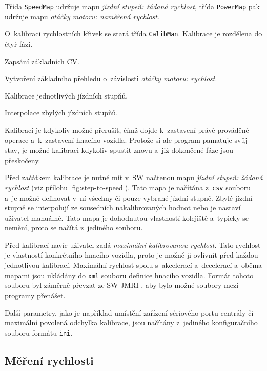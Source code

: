 Třída \texttt{SpeedMap} udržuje mapu \textit{jízdní stupeň: žádaná rychlost},
třída \texttt{Po\-wer\-Map} pak udržuje mapu \textit{otáčky motoru: naměřená
rychlost}.

O~kalibraci rychlostních křivek se stará třída \texttt{CalibMan}. Kalibrace
je rozdělena do čtyř fází.

\begin{compactenum}
\item Zapsání základních \gls{CV}.
\item Vytvoření základního přehledu o~závislosti \textit{otáčky motoru: rychlost}.
\item Kalibrace jednotlivých jízdních stupňů.
\item Interpolace zbylých jízdních stupňů.
\end{compactenum}

Kalibraci je kdykoliv možné přerušit, čímž dojde k~zastavení právě prováděné
operace a~k~zastavení hnacího vozidla. Protože si ale program pamatuje svůj
stav, je možné kalibraci kdykoliv spustit znovu a~již dokončené fáze jsou
přeskočeny.

Před začátkem kalibrace je nutné mít v~SW načtenou mapu \textit{jízdní
stupeň: žádaná rychlost} (viz přílohu \ref{fig:step-to-speed}). Tato mapa je
načítána z~\texttt{csv} souboru a~je možné definovat v~ní všechny či pouze
vybrané jízdní stupně. Zbylé jízdní stupně se interpolují ze sousedních
nakalibrovaných hodnot nebo je nastaví uživatel manuálně. Tato mapa je
dohodnutou vlastností kolejiště a~typicky se nemění, proto se načítá z~jediného
souboru.

Před kalibrací navíc uživatel zadá \textit{maximální kalibrovanou rychlost}.
Tato rychlost je vlastností konkrétního hnacího vozidla, proto je možné ji
ovlivnit před každou jednotlivou kalibrací. Maximální rychlost spolu
s~akcelerací a~decelerací a~oběma mapami jsou ukládány do \texttt{xml} souboru
definice hnacího vozidla. Formát tohoto souboru byl záměrně převzat ze SW JMRI
\cite{jmri:web}, aby bylo možné soubory mezi programy přenášet.

Další parametry, jako je například umístění zařízení sériového portu centrály
či maximální povolená odchylka kalibrace, jsou načítány z~jediného
konfiguračního souboru formátu \texttt{ini}.

\subsection{Měření rychlosti}
\label{sec:ac:lt-measure}

